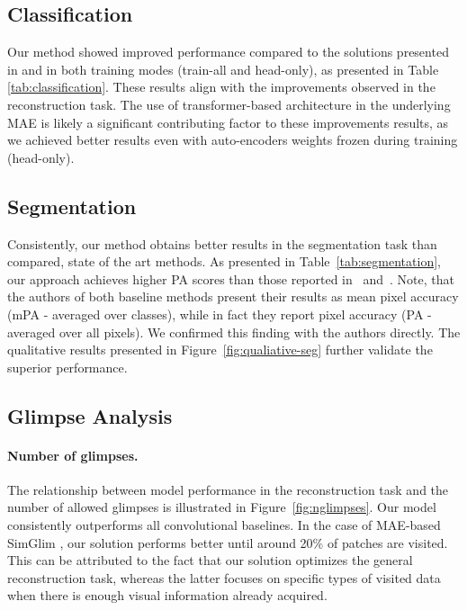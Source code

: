 \documentclass{article}
\begin{document}
\subsection{Classification}


Our method showed improved performance compared to the solutions presented in \cite{seifi2021glimpse} and \cite{seifi2020segment} in both training modes (train-all and head-only), as presented in Table \ref{tab:classification}. These results align with the improvements observed in the reconstruction task. The use of transformer-based architecture in the underlying MAE \cite{he2022masked} is likely a significant contributing factor to these improvements results, as we achieved better results even with auto-encoders weights frozen during training (head-only).

\subsection{Segmentation}





Consistently, our method obtains better results in the segmentation task than compared, state of the art methods. As presented in Table~\ref{tab:segmentation}, our approach achieves higher PA scores than those reported in~\cite{seifi2020segment} and~\cite{seifi2021glimpse}. Note, that the authors of both baseline methods present their results as mean pixel accuracy (mPA - averaged over classes), while in fact they report pixel accuracy (PA - averaged over all pixels). We confirmed this finding with the authors directly. The qualitative results presented in Figure~\ref{fig:qualiative-seg} further validate the superior performance.

\subsection{Glimpse Analysis}

\paragraph{Number of glimpses.} 

The relationship between model performance in the reconstruction task and the number of allowed glimpses is illustrated in Figure~\ref{fig:nglimpses}. Our model consistently outperforms all convolutional baselines. In the case of MAE-based SimGlim \cite{Jha2023WACV}, our solution performs better until around 20\% of patches are visited. This can be attributed to the fact that our solution optimizes the general reconstruction task, whereas the latter focuses on specific types of visited data when there is enough visual information already acquired.
\end{document}
